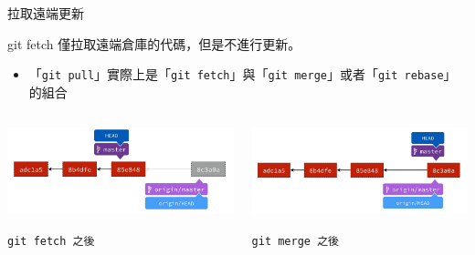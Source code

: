 \documentclass[xetex, unicode, 10pt, aspectratio=169]{beamer}
\begin{document}
\begin{frame}{拉取遠端更新}
    \begin{block}{git fetch}
        僅拉取遠端倉庫的代碼，但是不進行更新。
        \begin{itemize}
            \item 「\texttt{git pull}」實際上是「\texttt{git
                fetch}」與「\texttt{git merge}」或者「\texttt{git rebase}」的組合
        \end{itemize}
        \begin{columns}
            \begin{column}{0.5\textwidth}
                \begin{center}
                    \includegraphics[height=1in]{./img/git-after-fetch.png}

                    \texttt{git fetch 之後}
                \end{center}
            \end{column}

            \begin{column}{0.5\textwidth}
                \begin{center}
                    \includegraphics[height=1in]{./img/git-after-fetch-merge.png}

                    \texttt{git merge 之後}
                \end{center}
            \end{column}
        \end{columns}
    \end{block}
\end{frame}
\end{document}
